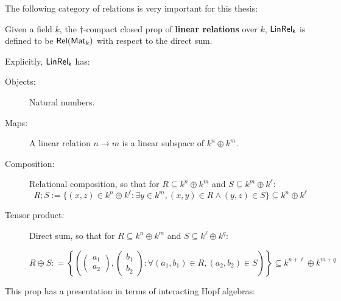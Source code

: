 The following category of relations is very important for this thesis:


\begin{definition}
Given a field $k$, the $\dag$-compact closed prop of {\bf linear relations} over $k$, $\sf LinRel_{k}$ is defined to be $\mathsf{Rel}(\mathsf{Mat}_k)$ with respect to the direct sum.

Explicitly, $\sf LinRel_{k}$ has:

\begin{description}
\item[Objects:] Natural numbers.

\item[Maps:] A linear relation $n\to m$ is a linear subspace of $k^n \oplus k^m$.

\item[Composition:] Relational composition, so that for $R \subseteq k^n \oplus k^m$  and $S \subseteq k^m \oplus k^\ell$:
$$
R;S := \{  (x,z) \in k^{n} \oplus k^{\ell} : \exists y \in k^{m}, (x,y) \in R \wedge (y,z) \in S \} \subseteq k^n \oplus k^\ell
$$ 

\item[Tensor product:] Direct sum, so that for $R \subseteq k^n \oplus k^m$ and $S \subseteq k^\ell \oplus k^q$:

$$R\oplus S : =
\left\{
\left(
\begin{pmatrix}
a_1\\a_2
\end{pmatrix},
\begin{pmatrix}
b_1\\b_2
\end{pmatrix}
:
\forall (a_1,b_1) \in R, (a_2,b_2) \in S
\right)
\right\} \subseteq k^{n+\ell}\oplus k^{m+q}
$$

\end{description}
\end{definition}

This prop has a presentation in terms of interacting Hopf algebras:

